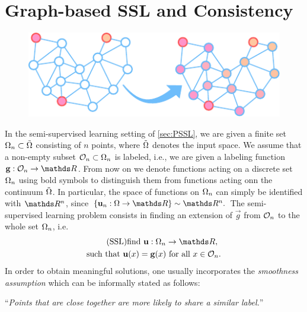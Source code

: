 \section{Graph-based SSL and Consistency}\label{sec:GSSL}

\begin{figure}
\centering
\includegraphics[width=.5\textwidth]{atelier/paradigms/GSSL.pdf}
\end{figure}

In the semi-supervised learning setting of \cref{sec:PSSL}, we are given a finite set $\Omega_n\subset \tilde{\Omega}$ consisting of $n$ points, where $\tilde{\Omega}$ 
denotes the input space. We assume that a non-empty subset $\mathcal{O}_n \subset \Omega_n$ is labeled, i.e., we are given a labeling function
$\vec g:\conset_n\to\R$. From now on we denote functions acting on a discrete set $\Omega_n$ using bold symbols to distinguish them from functions acting onn the continuum $\tilde{\Omega}$. In particular, the space of functions on $\Omega_n$ can simply be identified with $\R^n$, since $\{\vec u_n:\domain\to\R\} \sim \R^n.$
%
\noindent%
The semi-supervised learning problem consists in finding an extension of $\vec g$ from $\mathcal{O}_n$ to the whole set $\Omega_n$, i.e.
%
\begin{gather}\label{eq:SSL}
\begin{gathered}\tag{SSL}
\text{find } \vec u:\domain_n\to\R,\\
\text{such that } \vec u(x) = \vec g(x) \text{ for all } x\in\conset_n.
\end{gathered}
\end{gather}
%
%
%
%
In order to obtain meaningful solutions, one usually incorporates the \emph{smoothness assumption} \cite{subramanya2014graph} which can be informally stated as follows:
%
\begin{center}
\enquote{\textit{Points that are close together are more likely to share a similar label.}}
\end{center}
%
%
